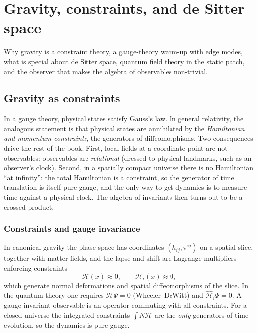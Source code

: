 \chapter{Gravity, constraints, and de Sitter space}\label{ch:gravity_ds}

Why gravity is a constraint theory, a gauge-theory warm-up with edge modes, what is special about de Sitter space, quantum field theory in the static patch, and the observer that makes the algebra of observables non-trivial.

\section{Gravity as constraints}\label{ch:gravity_constraints}

\begin{physmotiv}
In a gauge theory, physical states satisfy Gauss's law. In general relativity, the analogous statement is that physical states are annihilated by the \emph{Hamiltonian and momentum constraints}, the generators of diffeomorphisms. Two consequences drive the rest of the book. First, local fields at a coordinate point are not observables: observables are \emph{relational} (dressed to physical landmarks, such as an observer's clock). Second, in a spatially compact universe there is no Hamiltonian ``at infinity'': the total Hamiltonian is a constraint, so the generator of time translation is itself pure gauge, and the only way to get dynamics is to measure time against a physical clock. The algebra of invariants then turns out to be a crossed product.
\end{physmotiv}

\subsection{Constraints and gauge invariance}

In canonical gravity the phase space has coordinates $(h_{ij},\pi^{ij})$ on a spatial slice, together with matter fields, and the lapse and shift are Lagrange multipliers enforcing constraints
\begin{equation}
\mathcal H(x)\approx0,\qquad\mathcal H_i(x)\approx0,
\end{equation}
which generate normal deformations and spatial diffeomorphisms of the slice. In the quantum theory one requires $\hat{\mathcal H}\Psi=0$ (Wheeler--DeWitt) and $\hat{\mathcal H}_i\Psi=0$. A gauge-invariant observable is an operator commuting with all constraints. For a closed universe the integrated constraints $\int N\mathcal H$ are the \emph{only} generators of time evolution, so the dynamics is pure gauge.

